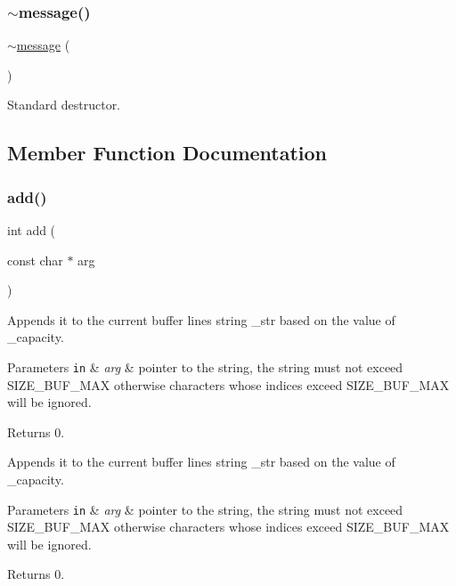 \subsubsection{\texorpdfstring{$\sim$message()}{~message()}}
{\footnotesize\ttfamily $\sim$\hyperlink{classmessage}{message} (\begin{DoxyParamCaption}{ }\end{DoxyParamCaption})}



Standard destructor. 



\subsection{Member Function Documentation}
\mbox{\label{classmessage_a86ea56f1017e712e5b721013f1bdfb49}} 
\subsubsection{\texorpdfstring{add()}{add()}}
{\footnotesize\ttfamily int add (\begin{DoxyParamCaption}\item[{const char $\ast$}]{arg }\end{DoxyParamCaption})}



Appends it to the current buffer line\textquotesingle{}s string \+\_\+str based on the value of \+\_\+capacity. 


\begin{DoxyParams}[1]{Parameters}
\mbox{\tt in}  & {\em arg} & pointer to the string, the string must not exceed S\+I\+Z\+E\+\_\+\+B\+U\+F\+\_\+\+M\+AX otherwise characters whose indices exceed S\+I\+Z\+E\+\_\+\+B\+U\+F\+\_\+\+M\+AX will be ignored. \\
\hline
\end{DoxyParams}
\begin{DoxyReturn}{Returns}
0.
\end{DoxyReturn}
Appends it to the current buffer line\textquotesingle{}s string \+\_\+str based on the value of \+\_\+capacity. 
\begin{DoxyParams}[1]{Parameters}
\mbox{\tt in}  & {\em arg} & pointer to the string, the string must not exceed S\+I\+Z\+E\+\_\+\+B\+U\+F\+\_\+\+M\+AX otherwise characters whose indices exceed S\+I\+Z\+E\+\_\+\+B\+U\+F\+\_\+\+M\+AX will be ignored. \\
\hline
\end{DoxyParams}
\begin{DoxyReturn}{Returns}
0. 
\end{DoxyReturn}
\mbox{\label{classmessage_ad7becd1f37b2db660d2335aec66075c8}} 
